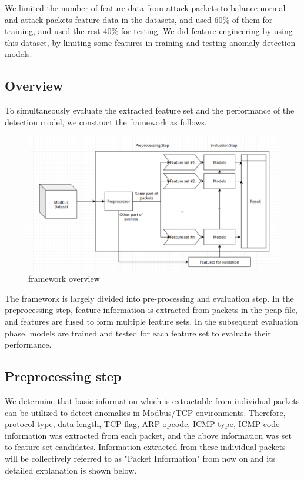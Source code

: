 \documentclass[fontsize=10pt]{article}
\begin{document}
We limited the number of feature data from attack packets to balance normal and attack packets feature data in the datasets, and used 60\% of them for training, and used the rest 40\% for testing. We did feature engineering by using this dataset, by limiting some features in training and testing anomaly detection models.


\subsection{Overview}
To simultaneously evaluate the extracted feature set and the performance of the detection model, we construct the framework as follows.
\begin{figure}[!htbp]
\centering
   \includegraphics[width=14cm]{overview}
   \hfil
\caption{framework overview}
\label{overview}
\end{figure}


The framework is largely divided into pre-processing and evaluation step. In the preprocessing step, feature information is extracted from packets in the pcap file, and features are fused to form multiple feature sets. In the subsequent evaluation phase, models are trained and tested for each feature set to evaluate their performance.


\subsection{Preprocessing step}
We determine that basic information which is extractable from individual packets can be utilized to detect anomalies in Modbus/TCP environments. Therefore, protocol type, data length, TCP flag, ARP opcode, ICMP type, ICMP code information was extracted from each packet, and the above information was set to feature set candidates. Information extracted from these individual packets will be collectively referred to as "Packet Information" from now on and its detailed explanation is shown below.
\end{document}
